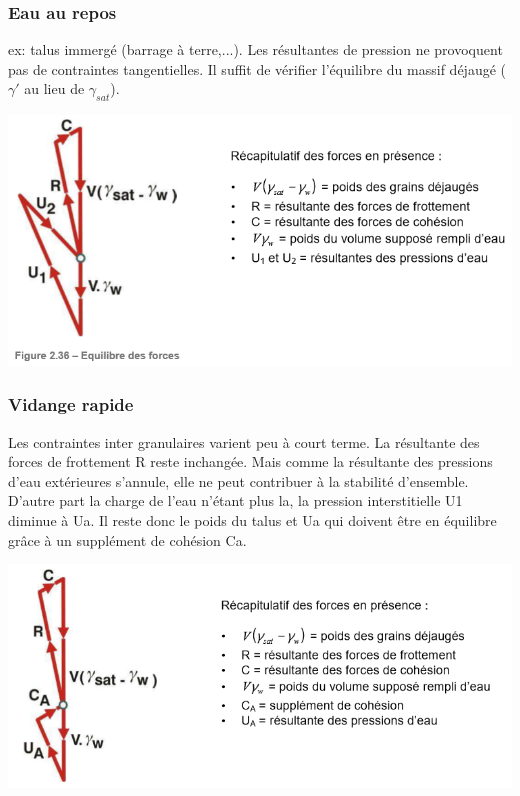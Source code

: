 \subsubsection{Eau au repos}

ex: talus immergé (barrage à terre,...).
Les résultantes de pression ne provoquent pas de contraintes tangentielles. Il suffit de vérifier l'équilibre du massif déjaugé ($\gamma'$ au lieu de $\gamma_{sat}$).

\begin{center}
\includegraphics [scale=0.8]{pictures/236.PNG}
\end{center}

\subsubsection{Vidange rapide}

Les contraintes inter granulaires varient peu à court terme. La résultante des forces de frottement R reste inchangée. Mais comme la résultante des pressions d'eau extérieures s'annule, elle ne peut contribuer à la stabilité d'ensemble. D'autre part la charge de l'eau n'étant plus la, la pression interstitielle U1 diminue à Ua. Il reste donc le poids du talus et Ua qui doivent être en équilibre grâce à un supplément de cohésion Ca.

\begin{center}
\includegraphics [scale=0.8]{pictures/21.PNG}
\end{center}

